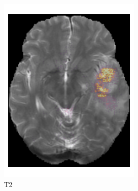 \begin{figure}[htbp]
\begin{subfigure}[b]{\textwidth}
\begin{subfigure}[b]{0.24\textwidth}
        \includegraphics[width=\textwidth]{Figures/saliency_HGG_T2.png}
        \caption*{\acrshort{T2}\nopunct}
        \end{subfigure}
        \hfill
        \begin{subfigure}[b]{0.24\textwidth}

\end{subfigure}
\end{subfigure}
\end{figure}
